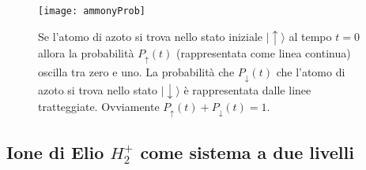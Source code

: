 \begin{figure}[!ht]
\vspace{0.1in}
\texttt{[image: ammonyProb]}	
\centering
\vspace{0.3in}
\caption{Se l'atomo di azoto si trova nello stato iniziale $|\uparrow \rangle$ al tempo $t=0$  allora la probabilit\`a $P_{\uparrow}(t)$ (rappresentata come linea continua) oscilla tra zero e uno. La probabilit\`a che $P_{\downarrow}(t)$ che l'atomo di azoto si trova nello stato $|\downarrow \rangle$ \`e rappresentata dalle linee tratteggiate. Ovviamente $P_{\uparrow}(t) + P_{\downarrow}(t) =1$.}
\end{figure}

\subsection{Ione di Elio $H_2^+$ come sistema a due livelli}



